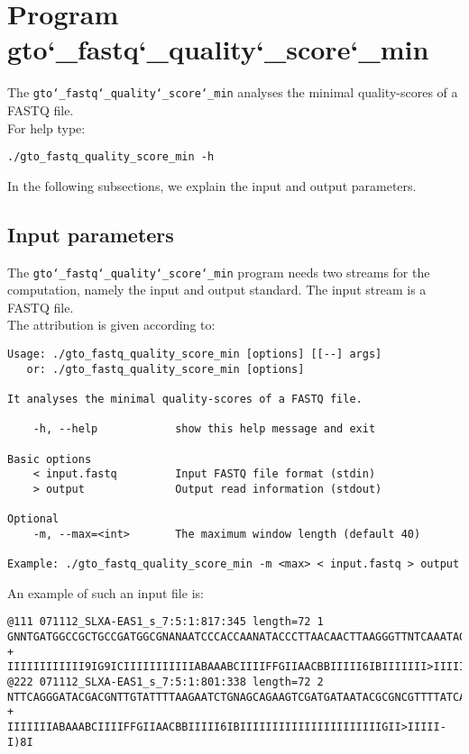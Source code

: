\section{Program gto\char`_fastq\char`_quality\char`_score\char`_min}
The \texttt{gto\char`_fastq\char`_quality\char`_score\char`_min} analyses the minimal quality-scores of a FASTQ file.\\
For help type:
\begin{lstlisting}
./gto_fastq_quality_score_min -h
\end{lstlisting}
In the following subsections, we explain the input and output parameters.

\subsection*{Input parameters}

The \texttt{gto\char`_fastq\char`_quality\char`_score\char`_min} program needs two streams for the computation, namely the input and output standard. The input stream is a FASTQ file.\\
The attribution is given according to:
\begin{lstlisting}
Usage: ./gto_fastq_quality_score_min [options] [[--] args]
   or: ./gto_fastq_quality_score_min [options]

It analyses the minimal quality-scores of a FASTQ file.

    -h, --help            show this help message and exit

Basic options
    < input.fastq         Input FASTQ file format (stdin)
    > output              Output read information (stdout)

Optional
    -m, --max=<int>       The maximum window length (default 40)

Example: ./gto_fastq_quality_score_min -m <max> < input.fastq > output
\end{lstlisting}
An example of such an input file is:
\begin{lstlisting}
@111 071112_SLXA-EAS1_s_7:5:1:817:345 length=72 1
GNNTGATGGCCGCTGCCGATGGCGNANAATCCCACCAANATACCCTTAACAACTTAAGGGTTNTCAAATAGA
+
IIIIIIIIIIII9IG9ICIIIIIIIIIIIABAAABCIIIIFFGIIAACBBIIIII6IBIIIIIII>IIIIII/
@222 071112_SLXA-EAS1_s_7:5:1:801:338 length=72 2
NTTCAGGGATACGACGNTTGTATTTTAAGAATCTGNAGCAGAAGTCGATGATAATACGCGNCGTTTTATCAN
+
IIIIIIIABAAABCIIIIFFGIIAACBBIIIII6IBIIIIIIIIIIIIIIIIIIIIIIGII>IIIII-I)8I
\end{lstlisting}

